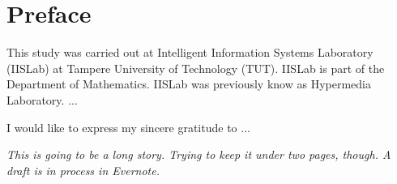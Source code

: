 \chapter{Preface}  
\label{chapter:Preface}

This study was carried out at Intelligent Information Systems Laboratory (IISLab) at Tampere University of Technology (TUT). IISLab is part of the Department of Mathematics. IISLab was previously know as Hypermedia Laboratory. ...

I would like to express my sincere gratitude to ...

\emph{This is going to be a long story. Trying to keep it under two pages, though. A draft is in process in Evernote.}